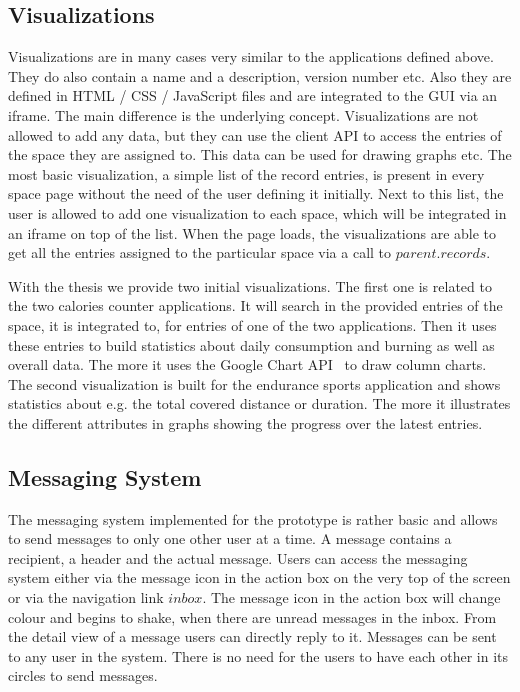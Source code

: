 \subsection{Visualizations}

Visualizations are in many cases very similar to the applications defined above. They do also contain a name and a description, version number etc. Also they are defined in HTML / CSS / JavaScript files and are integrated to the GUI via an iframe. The main difference is the underlying concept. Visualizations are not allowed to add any data, but they can use the client API to access the entries of the space they are assigned to. This data can be used for drawing graphs etc. The most basic visualization, a simple list of the record entries, is present in every space page without the need of the user defining it initially. Next to this list, the user is allowed to add one visualization to each space, which will be integrated in an iframe on top of the list. When the page loads, the visualizations are able to get all the entries assigned to the particular space via a call to $parent.records$.

With the thesis we provide two initial visualizations. The first one is related to the two calories counter applications. It will search in the provided entries of the space, it is integrated to, for entries of one of the two applications. Then it uses these entries to build statistics about daily consumption and burning as well as overall data. The more it uses the Google Chart API~\cite{chartapi} to draw column charts. The second visualization is built for the endurance sports application and shows statistics about e.g. the total covered distance or duration. The more it illustrates the different attributes in graphs showing the progress over the latest entries.


\subsection{Messaging System}

The messaging system implemented for the prototype is rather basic and allows to send messages to only one other user at a time. A message contains a recipient, a header and the actual message. Users can access the messaging system either via the message icon in the action box on the very top of the screen or via the navigation link $inbox$. The message icon in the action box will change colour and begins to shake, when there are unread messages in the inbox. From the detail view of a message users can directly reply to it. Messages can be sent to any user in the system. There is no need for the users to have each other in its circles to send messages. 



